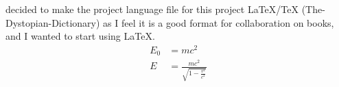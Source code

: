 \documentclass{article} %
\title{\ProjectLanguageFile} %
\begin{document}
  \maketitle
  \I decided to make the project language file for this project LaTeX/TeX (The-Dystopian-Dictionary) as I feel it is a good format for collaboration on books, and I wanted to start using LaTeX.
  \begin{align}
    E_0 &= mc^2 \\
    E &= \frac{mc^2}{\sqrt{1-\frac{v^2}{c^2}}}
  \end{align} 
\end{document}

